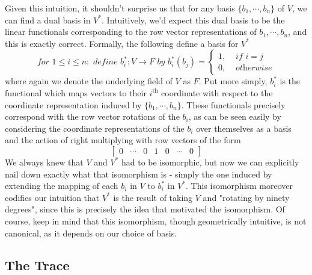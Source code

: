 \documentclass{article}
\newcommand{\nn}{\leavevmode \newline \newline}
\begin{document}
\nn
Given this intuition, it shouldn't surprise us that for any basis $ \{ b_1, \cdots, b_n \} $ of $ V $, we can find a dual basis in $ V^* $. Intuitively, we'd expect this dual basis to be the linear functionals corresponding to the row vector representations of $ b_1, \cdots, b_n $, and this is exactly correct. Formally, the following define a basis for $ V^* $
	$$ \textit{ for } 1 \leq i \leq n: \textit{ define } b_i^*: V \rightarrow F \textit{ by } b_i^*(b_j) = \begin{cases}
		1, &\textit{ if } i = j \\
		0, &\textit{ otherwise }
	\end{cases} $$
where again we denote the underlying field of $ V $ as $ F $. Put more simply, $ b_i^* $ is the functional which maps vectors to their $ i^\text{th} $ coordinate with respect to the coordinate representation induced by $ \{ b_1, \cdots, b_n \} $. These functionals precisely correspond with the row vector rotations of the $ b_i $, as can be seen easily by considering the coordinate representations of the $ b_i $ over themselves as a basis and the action of right multiplying with row vectors of the form
	$$ \begin{bmatrix} 0 & \cdots & 0 & 1 & 0 & \cdots & 0 \end{bmatrix} $$
We always knew that $ V $ and $ V^* $ had to be isomorphic, but now we can explicitly nail down exactly what that isomorphism is - simply the one induced by extending the mapping of each $ b_i $ in $ V $ to $ b_i^* $ in $ V^* $. This isomorphism moreover codifies our intuition that $ V^* $ is the result of taking $ V $ and "rotating by ninety degrees", since this is precisely the idea that motivated the isomorphism. Of course, keep in mind that this isomorphism, though geometrically intuitive, is not canonical, as it depends on our choice of basis.

\subsection{The Trace}
\end{document}
